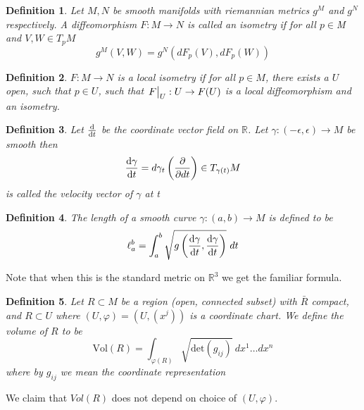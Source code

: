 \documentclass[a4paper]{article}
\newtheorem*{defn}{Definition}
\begin{document}
\begin{defn}
  Let $M,N$ be smooth manifolds with riemannian metrics $g^M$ and $g^N$ respectively. A diffeomorphism $F:M \rightarrow N$ is called an isometry if for all $p \in $M and $V,W \in T_pM$
  \[
    g^M(V,W) = g^N(dF_p(V), dF_p(W))
  \]
\end{defn}

\begin{defn}
  $F:M \rightarrow N$ is a local isometry if for all $p \in M$, there exists a $U$ open, such that $p \in U$, such that $\eval{F}_U: U \rightarrow F(U)$ is a local diffeomorphism and an isometry.
\end{defn}

\begin{defn}
  Let $\dv{}{t}$ be the coordinate vector field on $\mathds{R}$. Let $\gamma:(-\epsilon, \epsilon) \rightarrow M$ be smooth then 
  \[
    \dv{\gamma}{t} = d\gamma_t\left(\pdv{}{dt}\right) \in T_{\gamma(t)}M
  \]
  is called the velocity vector of $\gamma$ at t
\end{defn}

\begin{defn}
  The length of a smooth curve $\gamma: (a,b) \rightarrow M$ is defined to be
  \[
    \ell_a^b = \int_{a}^b \sqrt{g\left(\dv{\gamma}{t}, \dv{\gamma}{t}\right)}\ dt
  \]
\end{defn}
Note that when this is the standard metric on $\mathds{R}^3$ we get the familiar formula.

\begin{defn}
  Let $R \subset M$ be a region (open, connected subset) with $\bar{R}$ compact, and $R \subset U$ where $(U, \varphi) = (U, (x^j))$ is a coordinate chart. We define the volume of $R$ to be 
  \[
    \text{Vol}(R) = \int_{\varphi(R)} \sqrt{\text{det}(g_{ij})}\ dx^1 \dots dx^n
  \]
  where by $g_{ij}$ we mean the coordinate representation
\end{defn}
We claim that $Vol(R)$ does not depend on choice of $(U, \varphi)$.
\end{document}
